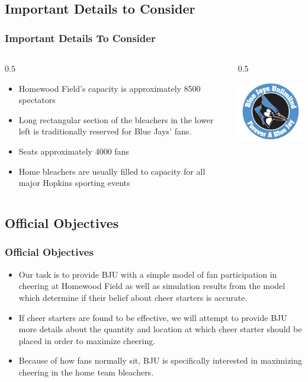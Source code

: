 \documentclass[compress,handout,10pt]{beamer}
\let\olditem\item
\renewcommand{\item}{\setlength{\itemsep}{0.5\baselineskip}\olditem}
\begin{document}
\subsection{Important Details to Consider}

\begin{frame}
	\frametitle {Important Details To Consider}
		\begin {columns}
			\begin {column}{0.5\textwidth}
				\begin{itemize}
					\item Homewood Field's capacity is approximately 8500 spectators
					\item Long rectangular section of the bleachers in the lower left is traditionally reserved for Blue Jays' fans.
						\item Seats approximately 4000 fans
					\item Home bleachers are usually filled to capacity for all major Hopkins sporting events
				\end {itemize}
			\end {column}
			\begin {column}{0.5\textwidth}
				\begin{center}
    			\includegraphics [width=2in] {BJU.jpg}
    		\end{center}
			\end {column}
		\end {columns}
\end{frame}

\subsection{Official Objectives}

\begin{frame}
	\frametitle {Official Objectives}
	\begin {itemize}
		\item Our task is to provide BJU with a simple model of fan participation in cheering at Homewood Field as well as simulation results from the model which determine if their belief about cheer starters is accurate. 
		\item If cheer starters are found to be effective, we will attempt to provide BJU more details about the quantity and location at which cheer starter should be placed in order to maximize cheering.
		\item Because of how fans normally sit, BJU is specifically interested in maximizing cheering in the home team bleachers.
	\end {itemize} 
\end{frame}
\end{document}
